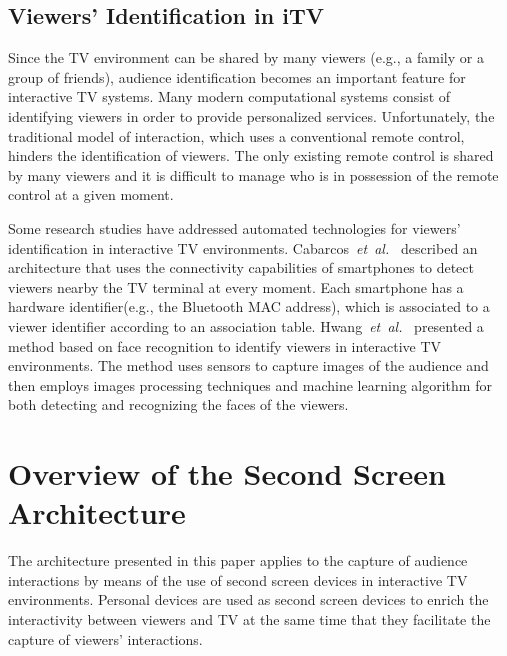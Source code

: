 \documentclass[journal]{IEEEtran}
\begin{document}
\subsection{Viewers' Identification in iTV}
\label{ssec_ident_viewers_itv}

Since the TV environment can be shared by many viewers (e.g., a family or a group of friends), audience identification becomes an important feature for interactive TV systems. Many modern computational systems consist of identifying viewers in order to provide personalized services. Unfortunately, the traditional model of interaction, which uses a conventional remote control, hinders the identification of viewers. The only existing remote control is shared by many viewers and it is difficult to manage who is in possession of the remote control at a given moment.

Some research studies have addressed automated technologies for viewers' identification in interactive TV environments. Cabarcos~\emph{et~al.}~\cite{Cabarcos2011} described an architecture that uses the connectivity capabilities of smartphones to detect viewers nearby the TV terminal at every moment. Each smartphone has a hardware identifier(e.g., the Bluetooth MAC address), which is associated to a viewer identifier according to an association table. Hwang~\emph{et~al.}~\cite{Hwang2007} presented a method based on face recognition to identify viewers in interactive TV environments. The method uses sensors to capture images of the audience and then employs images processing techniques and machine learning algorithm for both detecting and recognizing the faces of the viewers.

\section{Overview of the Second Screen Architecture}

The architecture presented in this paper applies to the capture of audience interactions by means of the use of second screen devices in interactive TV environments. Personal devices are used as second screen devices to enrich the interactivity between viewers and TV at the same time that they facilitate the capture of viewers' interactions.
\end{document}
